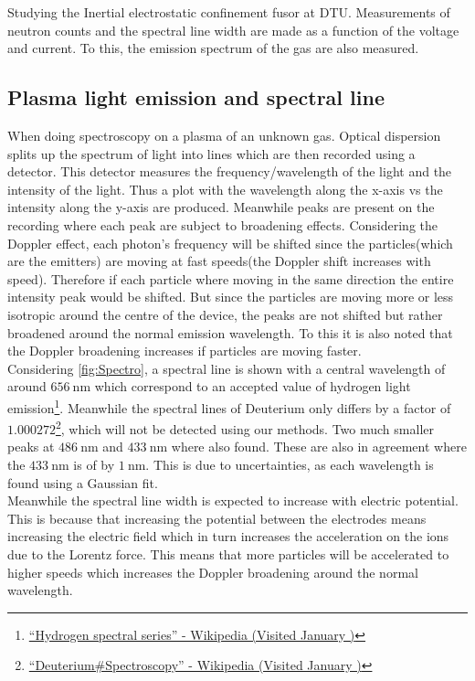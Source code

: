 Studying the Inertial electrostatic confinement fusor at DTU. Measurements of neutron counts and the spectral line width are made as a function of the voltage and current. To this, the emission spectrum of the gas are also measured.
\subsection{Plasma light emission and spectral line}
When doing spectroscopy on a plasma of an unknown gas. Optical dispersion splits up the spectrum of light into lines which are then recorded using a detector. This detector measures the frequency/wavelength of the light and the intensity of the light. Thus a plot with the wavelength along the x-axis vs the intensity along the y-axis are produced. Meanwhile peaks are present on the recording where each peak are subject to broadening effects. Considering the Doppler effect, each photon's frequency will be shifted since the particles(which are the emitters) are moving at fast speeds(the Doppler shift increases with speed). Therefore if each particle where moving in the same direction the entire intensity peak would be shifted. But since the particles are moving more or less isotropic around the centre of the device, the peaks are not shifted but rather broadened around the normal emission wavelength. To this it is also noted that the Doppler broadening increases if particles are moving faster.\\
Considering \cref{fig:Spectro}, a spectral line is shown with a central wavelength of around $\SI{656}{\nano\meter}$ which correspond to an accepted value of hydrogen light emission\footnote{\href{https://en.wikipedia.org/wiki/Hydrogen_spectral_series}{``Hydrogen spectral series'' - Wikipedia (Visited January )}}. Meanwhile the spectral lines of Deuterium only differs by a factor of $1.000272$\footnote{\href{https://en.wikipedia.org/wiki/Deuterium#Spectroscopy}{``Deuterium\#Spectroscopy'' - Wikipedia (Visited January )}}, which will not be detected using our methods. Two much smaller peaks at $\SI{486}{\nano\meter}$ and $\SI{433}{\nano\meter}$ where also found. These are also in agreement where the $\SI{433}{\nano\meter}$ is of by $\SI{1}{\nano\meter}$. This is due to uncertainties, as each wavelength is found using a Gaussian fit.\\
Meanwhile the spectral line width is expected to increase with electric potential. This is because that increasing the potential between the electrodes means increasing the electric field which in turn increases the acceleration on the ions due to the Lorentz force. This means that more particles will be accelerated to higher speeds which increases the Doppler broadening around the normal wavelength.

